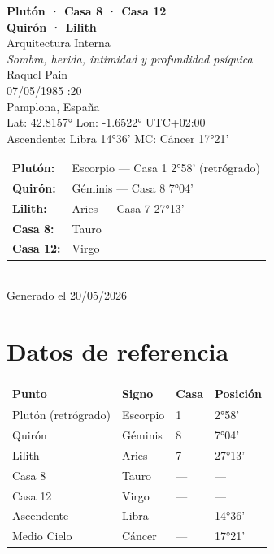 \documentclass[11pt,a4paper]{article}
\begin{document}
\begin{titlepage}
  \centering
  \vspace*{1.5cm}
  {\Huge\bfseries\color{azulai} Plutón · Casa 8 · Casa 12}\\[0.35cm]
  {\Huge\bfseries\color{azulai} Quirón · Lilith}\\[0.5cm]
  {\large\color{grisai} Arquitectura Interna}\\[0.3cm]
  {\small\itshape\color{grisai} Sombra, herida, intimidad y profundidad psíquica}\\[2cm]
  {\huge\color{doradoai} Raquel Pain}\\[1.5cm]
  {\Large 07/05/1985 :20}\\[0.3cm]
  {\Large Pamplona, España}\\[0.3cm]
  {\normalsize Lat: 42.8157° \quad Lon: -1.6522° \quad UTC+02:00}\\[0.3cm]
  {\normalsize Ascendente: Libra 14°36' \quad
    MC: Cáncer 17°21'}\\[2cm]

  \begin{tabular}{ll}
    \textbf{Plutón:}  & Escorpio — Casa 1 2°58' (retrógrado) \\
    \textbf{Quirón:}  & Géminis — Casa 8 7°04' \\
    \textbf{Lilith:}  & Aries — Casa 7 27°13' \\
    \textbf{Casa 8:}  & Tauro \\
    \textbf{Casa 12:} & Virgo \\
  \end{tabular}\\[2cm]

  \vfill
  {\small Generado el 20/05/2026}
\end{titlepage}

\tableofcontents
\newpage

\section{Datos de referencia}

\begin{center}
\begin{tabular}{llll}
  \toprule
  \textbf{Punto} & \textbf{Signo} & \textbf{Casa} & \textbf{Posición} \\
  \midrule
  Plutón (retrógrado) & Escorpio & 1 & 2°58' \\
  Quirón & Géminis & 8 & 7°04' \\
  Lilith          & Aries & 7 & 27°13' \\
  Casa 8          & Tauro             & ---                  & --- \\
  Casa 12         & Virgo            & ---                  & --- \\
  Ascendente      & Libra         & ---                  & 14°36' \\
  Medio Cielo     & Cáncer          & ---                  & 17°21' \\
  \bottomrule
\end{tabular}
\end{center}
\end{document}

